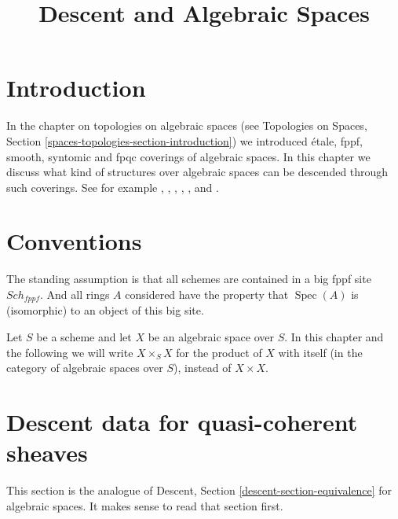 \documentclass{stacks-project}
\theoremstyle{plain}
\theoremstyle{definition}
\theoremstyle{remark}
\numberwithin{equation}{subsection}
\def\Spec{\mathop{\mathrm{Spec}}}
\def\Sch{\mathit{Sch}}
\begin{document}
\title{Descent and Algebraic Spaces}

\maketitle

\label{section-phantom}

\tableofcontents

\section{Introduction}
\label{section-introduction}

\noindent
In the chapter on topologies on algebraic spaces (see
Topologies on Spaces, Section \ref{spaces-topologies-section-introduction})
we introduced \'etale, fppf, smooth, syntomic and fpqc coverings of
algebraic spaces.
In this chapter we discuss what kind of structures over algebraic spaces
can be descended through such coverings.
See for example \cite{Gr-I}, \cite{Gr-II}, \cite{Gr-III},
\cite{Gr-IV}, \cite{Gr-V}, and \cite{Gr-VI}.



\section{Conventions}
\label{section-conventions}

\noindent
The standing assumption is that all schemes are contained in
a big fppf site $\Sch_{fppf}$. And all rings $A$ considered
have the property that $\Spec(A)$ is (isomorphic) to an
object of this big site.

\medskip\noindent
Let $S$ be a scheme and let $X$ be an algebraic space over $S$.
In this chapter and the following we will write $X \times_S X$
for the product of $X$ with itself (in the category of algebraic
spaces over $S$), instead of $X \times X$.






\section{Descent data for quasi-coherent sheaves}
\label{section-equivalence}

\noindent
This section is the analogue of
Descent, Section \ref{descent-section-equivalence}
for algebraic spaces.
It makes sense to read that section first.
\end{document}

